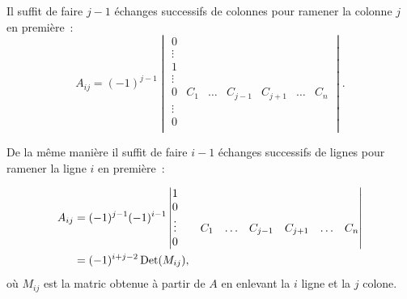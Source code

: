 Il suffit de faire \(j-1\) échanges successifs de colonnes pour ramener la colonne \(j\) en première~:
\begin{equation}
  A_{ij} = (-1)^{j-1} 
\begin{vmatrix} 
      0     &        &        &      &       &        &  \\
     \vdots &        &        &      &       &        &  \\
      1     &        &        &      &       &        &  \\
     \vdots &        &        &      &       &        &  \\
      0     & C_1    & \ldots & C_{j-1}&C_{j+1} & \ldots & C_{n} \\
     \vdots &        &        &      &       &        &  \\
      0     &        &        &      &       &        &  \\    
  \end{vmatrix}.
\end{equation}

De la même manière il suffit de faire \(i-1\) échanges successifs de lignes pour ramener la ligne \(i\) en première~:

\begin{align}
  A_{ij} &= (-1)^{j-1} (-1)^{i-1}
\begin{vmatrix} 
      1     &        &        &       &      &        & \\
      0     &        &        &      &       &        &  \\    
     \vdots &        & C_1    & \ldots & C_{j-1}&C_{j+1} & \ldots & C_{n} \\
      0     &        &        &      &       &        &  \\    
  \end{vmatrix}\\
  &=(-1)^{i+j-2} \operatorname{Det}(M_{ij}),
\end{align}
où \(M_{ij}\) est la matric obtenue à partir de \(A\) en enlevant la \(i\)\ieme{} ligne et la \(j\)\ieme{} colone.


